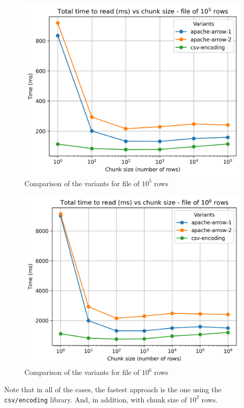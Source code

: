 \begin{figure}[H]
  \centering
  \includegraphics[scale = 0.7]{images/4-Experiments/read-input-10-5.png}
  \caption{Comparison of the variants for file of $10^5$ rows}
\end{figure}

\begin{figure}[H]
  \centering
  \includegraphics[scale = 0.7]{images/4-Experiments/read-input-10-6.png}
  \caption{Comparison of the variants for file of $10^6$ rows}
\end{figure}

Note that in all of the cases, the fastest approach is the one using the \texttt{csv/encoding} library. And, in addition, with chunk size of $10^2$ rows.

